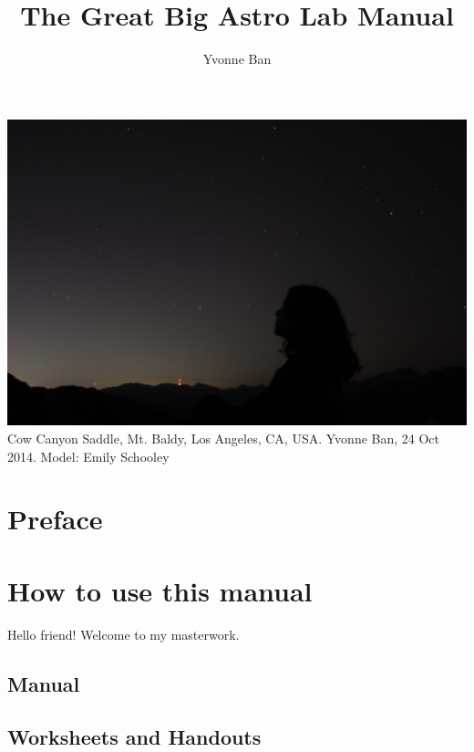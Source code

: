 \documentclass[12pt]{article}
\title{The Great Big Astro Lab Manual}
\author{Yvonne Ban}
\begin{document}
\begin{titlepage}

\maketitle
\begin{center}
\includegraphics[width=\textwidth]{IMG_0499.JPG}
Cow Canyon Saddle, Mt. Baldy, Los Angeles, CA, USA. Yvonne Ban, 24 Oct 2014. Model: Emily Schooley
\end{center}

\thispagestyle{empty}
\clearpage
{}

\end{titlepage}

\tableofcontents

\section*{Preface}

\section{How to use this manual}
Hello friend! Welcome to my masterwork.

\subsection{Manual}

\subsection{Worksheets and Handouts}
\end{document}
